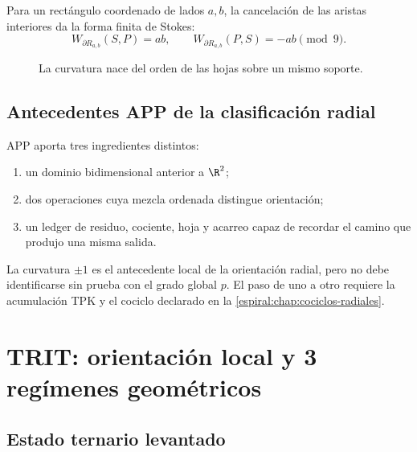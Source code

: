 Para un rectángulo coordenado de lados \(a,b\), la cancelación de las
aristas interiores da la forma finita de Stokes:
\[
 W_{\partial R_{a,b}}(S,P)=ab,\qquad
 W_{\partial R_{a,b}}(P,S)=-ab\pmod9.
\]

\begin{figure}[htbp]
\centering
{}
\caption{La curvatura nace del orden de las hojas sobre un mismo soporte.}
\label{espiral:fig:curvatura-app}
\end{figure}

\section{Antecedentes APP de la clasificación radial}

APP aporta tres ingredientes distintos:
\begin{enumerate}
\item un dominio bidimensional anterior a \(\R^2\);
\item dos operaciones cuya mezcla ordenada distingue orientación;
\item un ledger de residuo, cociente, hoja y acarreo capaz de recordar el
camino que produjo una misma salida.
\end{enumerate}
La curvatura \(\pm1\) es el antecedente local de la orientación radial, pero
no debe identificarse sin prueba con el grado global \(p\). El paso de uno a
otro requiere la acumulación TPK y el cociclo declarado en la
\cref{espiral:chap:cociclos-radiales}.

\chapter{TRIT: orientación local y 3 regímenes geométricos}

\section{Estado ternario levantado}

